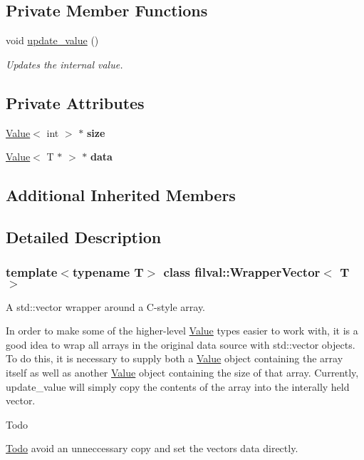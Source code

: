 \subsection*{Private Member Functions}
\begin{DoxyCompactItemize}
\item 
void \hyperlink{classfilval_1_1WrapperVector_a959d593dca6d6a7ef7ed2ff3c4f28632}{update\+\_\+value} ()
\begin{DoxyCompactList}\small\item\em Updates the internal value. \end{DoxyCompactList}\end{DoxyCompactItemize}
\subsection*{Private Attributes}
\begin{DoxyCompactItemize}
\item 
\hypertarget{classfilval_1_1WrapperVector_a6d54851468a907eead3e1e35842d1c7d}{}\label{classfilval_1_1WrapperVector_a6d54851468a907eead3e1e35842d1c7d} 
\hyperlink{classfilval_1_1Value}{Value}$<$ int $>$ $\ast$ {\bfseries size}
\item 
\hypertarget{classfilval_1_1WrapperVector_a2b9d3df8ac85d80c7cb6c5742bd106ea}{}\label{classfilval_1_1WrapperVector_a2b9d3df8ac85d80c7cb6c5742bd106ea} 
\hyperlink{classfilval_1_1Value}{Value}$<$ T $\ast$ $>$ $\ast$ {\bfseries data}
\end{DoxyCompactItemize}
\subsection*{Additional Inherited Members}


\subsection{Detailed Description}
\subsubsection*{template$<$typename T$>$\newline
class filval\+::\+Wrapper\+Vector$<$ T $>$}

A std\+::vector wrapper around a C-\/style array. 

In order to make some of the higher-\/level \hyperlink{classfilval_1_1Value}{Value} types easier to work with, it is a good idea to wrap all arrays in the original data source with std\+::vector objects. To do this, it is necessary to supply both a \hyperlink{classfilval_1_1Value}{Value} object containing the array itself as well as another \hyperlink{classfilval_1_1Value}{Value} object containing the size of that array. Currently, update\+\_\+value will simply copy the contents of the array into the interally held vector. \begin{DoxyRefDesc}{Todo}
\item[\hyperlink{todo__todo000001}{Todo}]avoid an unneccessary copy and set the vectors data directly. \end{DoxyRefDesc}


